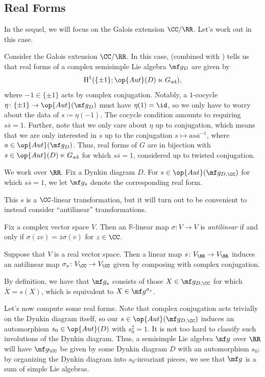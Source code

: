 \documentclass[../notes.tex]{subfiles}
\begin{document}
\subsection{Real Forms}
In the sequel, we will focus on the Galois extension $\CC/\RR$. Let's work out  in this case.
\begin{example}
	Consider the Galois extension $\CC/\RR$. In this case,  (combined with ) tells us that real forms of a complex semisimple Lie algebra $\mf g_D$ are given by
	\[\mathrm H^1(\{\pm1\};\op{Aut}(D)\ltimes G_{\mathrm{ad}}),\]
	where $-1\in\{\pm1\}$ acts by complex conjugation. Notably, a $1$-cocycle $\eta\colon\{\pm1\}\to\op{Aut}(\mf g_D)$ must have $\eta(1)=\id$, so we only have to worry about the data of $s\coloneqq\eta(-1)$. The cocycle condition amounts to requiring $s\overline s=1$. Further, note that we only care about $\eta$ up to conjugation, which means that we are only interested in $s$ up to the conjugation $s\mapsto as\overline a^{-1}$, where $a\in\op{Aut}(\mf g_D)$. Thus, real forms of $G$ are in bijection with $s\in\op{Aut}(D)\ltimes G_{\mathrm{ad}}$ for which $s\overline s=1$, considered up to twisted conjugation.
\end{example}
\begin{notation}
	We work over $\RR$. Fix a Dynkin diagram $D$. For $s\in\op{Aut}(\mf g_{D,\CC})$ for which $s\overline s=1$, we let $\mf g_s$ denote the corresponding real form.
\end{notation}
This $s$ is a $\CC$-linear transformation, but it will turn out to be convenient to instead consider ``antilinear'' transformations.
\begin{definition}[antilinear]
	Fix a complex vector space $V$. Then an $\mathbb R$-linear map $\sigma\colon V\to V$ is \textit{antilinear} if and only if $\sigma(zv)=\overline z\sigma(v)$ for $z\in\CC$.
\end{definition}
\begin{example}
	Suppose that $V$ is a real vector space. Then a linear map $s\colon V_\RR\to V_\RR$ induces an antilinear map $\sigma_s\colon V_\CC\to V_\CC$ given by composing with complex conjugation.
\end{example}
\begin{remark}
	By definition, we have that $\mf g_s$ consists of those $X\in\mf g_{D,\CC}$ for which $\overline X=s(X)$, which is equivalent to $X\in\mf g^{\sigma_s}$.
\end{remark}
Let's now compute some real forms. Note that complex conjugation acts trivially on the Dynkin diagram itself, so our $s\in\op{Aut}(\mf g_{D,\CC})$ induces an automorphism $s_0\in\op{Aut}(D)$ with $s_0^2=1$. It is not too hard to classify such involutions of the Dynkin diagram. Thus, a semisimple Lie algebra $\mf g$ over $\RR$ will have $\mf g_\CC$ be given by some Dynkin diagram $D$ with an automorphism $s_0$; by organizing the Dynkin diagram into $s_0$-invariant pieces, we see that $\mf g$ is a sum of simple Lie algebras.
\end{document}
